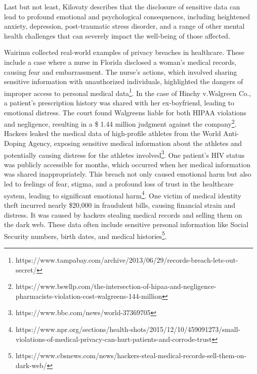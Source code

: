 \documentclass{article}
\begin{document}
Last but not least, Kilovaty \cite{2021_Kilovaty} describes that the disclosure of sensitive data can lead to profound emotional and psychological consequences, including heightened anxiety, depression, post-traumatic stress disorder, and a range of other mental health challenges that can severely impact the well-being of those affected.

Wairimu \cite{2022_Wairimu} collected real-world examples of privacy breaches in healthcare.
These include a case where a nurse in Florida disclosed a woman’s medical records, causing fear and embarrassment. The nurse’s actions, which involved sharing sensitive information with unauthorized individuals, highlighted the dangers of improper access to personal medical data\footnote{https://www.tampabay.com/archive/2013/06/29/records-breach-lets-out-secret/}.
In the case of Hinchy v.Walgreen Co., a patient’s prescription history was shared with her ex-boyfriend, leading to emotional distress. The court found Walgreens liable for both HIPAA violations and negligence, resulting in a \$ 1.44 million judgment against the company\footnote{https://www.bswllp.com/the-intersection-of-hipaa-and-negligence-pharmacists-violation-cost-walgreens-144-million}. 
Hackers leaked the medical data of high-profile athletes from the World Anti-Doping Agency, exposing sensitive medical information about the athletes and potentially causing distress for the athletes involved\footnote{https://www.bbc.com/news/world-37369705}. 
One patient’s HIV status was publicly accessible for months, which occurred when her medical information was shared inappropriately. This breach not only caused emotional harm but also led to feelings of fear, stigma, and a profound loss of trust in the healthcare system, leading to significant emotional harm\footnote{https://www.npr.org/sections/health-shots/2015/12/10/459091273/small-violations-of-medical-privacy-can-hurt-patients-and-corrode-trust}. 
One victim of medical identity theft incurred nearly \$20,000 in fraudulent bills, causing financial strain and distress. It was caused by hackers stealing medical records and selling them on the dark web. These data often include sensitive personal information like Social Security numbers, birth dates, and medical histories\footnote{https://www.cbsnews.com/news/hackers-steal-medical-records-sell-them-on-dark-web/}. 
\end{document}
